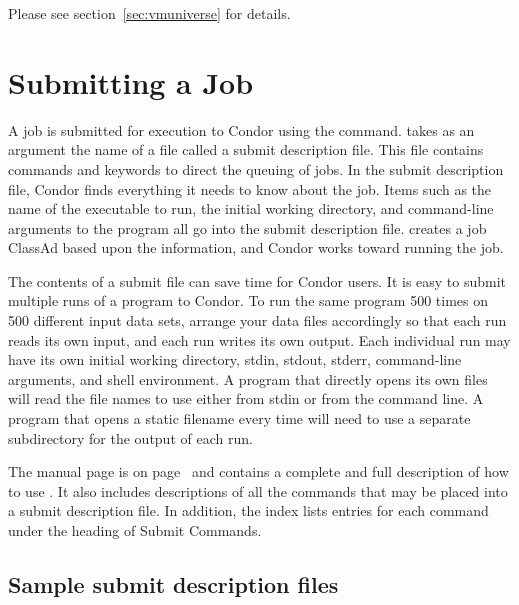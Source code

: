 Please see section~\ref{sec:vmuniverse} for details.


\section{Submitting a Job}

A job is submitted for execution to Condor using the
 command.
 takes as an argument the name of a
file called a submit description file.
This file contains commands and keywords to direct the queuing of jobs.
In the submit description file, Condor finds everything it needs
to know about the job.  Items such as the name of the executable to run,
the initial working directory, and command-line arguments to the
program all go into
the submit description file.   creates a job
ClassAd based upon the information,
and Condor
works toward running the job.

The contents of a submit file
can save time for Condor users.
It is easy to submit multiple runs of a program to
Condor. To run the same program 500 times on 500
different input data sets, arrange your data files
accordingly so that each run reads its own input, and each run
writes its own output.
Each individual run may have its own initial
working directory, stdin, stdout, stderr, command-line arguments, and
shell environment.
A program that directly opens its own
files will read the file names to use either from stdin
or from the command line. 
A program that opens a static filename every time
will need to use a separate subdirectory for the output of each run.

The  manual page 
is on page~\pageref{man-condor-submit} and
contains a complete and full description of how to use .
It also includes descriptions of all the commands that may be placed
into a submit description file.
In addition, the index lists entries for each command under the
heading of Submit Commands.

\subsection{\label{sec:sample-submit-files}Sample submit description files}  

